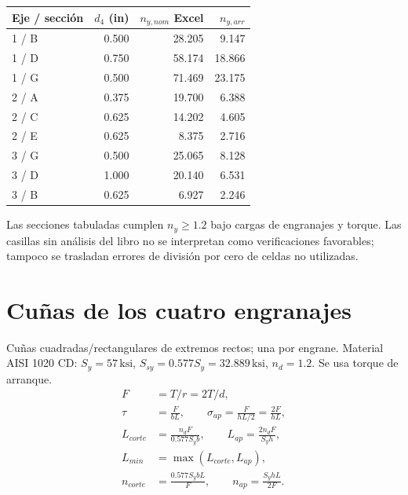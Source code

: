 \documentclass[11pt,a4paper]{article}
\newcommand{\ksi}{\,\mathrm{ksi}}
\begin{document}
\begin{center}\small\begin{tabular}{lrrr}\toprule

Eje / sección & $d_4$ (in) & $n_{y,nom}$ Excel & $n_{y,arr}$ \\ \midrule

1 / B & 0.500 & 28.205 & 9.147 \\

1 / D & 0.750 & 58.174 & 18.866 \\

1 / G & 0.500 & 71.469 & 23.175 \\

2 / A & 0.375 & 19.700 & 6.388 \\

2 / C & 0.625 & 14.202 & 4.605 \\

2 / E & 0.625 & 8.375 & 2.716 \\

3 / G & 0.500 & 25.065 & 8.128 \\

3 / D & 1.000 & 20.140 & 6.531 \\

3 / B & 0.625 & 6.927 & 2.246 \\

\bottomrule\end{tabular}\end{center}

Las secciones tabuladas cumplen $n_y\geq1.2$ bajo cargas de engranajes y torque. Las casillas sin análisis del libro no se interpretan como verificaciones favorables; tampoco se trasladan errores de división por cero de celdas no utilizadas.

\section{Cuñas de los cuatro engranajes}
Cuñas cuadradas/rectangulares de extremos rectos; una por engrane. Material AISI 1020 CD: $S_y=57\ksi$, $S_{sy}=0.577S_y=32.889\ksi$, $n_d=1.2$. Se usa torque de arranque.
\begin{align*}
F&=T/r=2T/d,\\
\tau&=\frac F{bL},\qquad \sigma_{ap}=\frac F{hL/2}=\frac{2F}{hL},\\
L_{corte}&=\frac{n_dF}{0.577S_yb},\qquad
L_{ap}=\frac{2n_dF}{S_yh},\\
L_{min}&=\max(L_{corte},L_{ap}),\\
n_{corte}&=\frac{0.577S_ybL}{F},\qquad n_{ap}=\frac{S_yhL}{2F}.
\end{align*}
\end{document}
